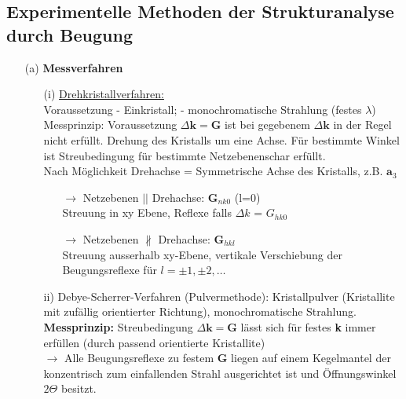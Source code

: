 \subsection{Experimentelle Methoden der Strukturanalyse durch Beugung} \label{kap:4_4}
\begin{itemize}
    \item[(a)] \textbf{Messverfahren}
    \begin{itemize}
        \item[(i)] \underline{Drehkristallverfahren:}\\
        Voraussetzung - Einkristall; - monochromatische Strahlung (festes $\lambda$)\\
        Messprinzip: Voraussetzung $\Delta \textbf{k} = \textbf{G}$ ist bei gegebenem $\Delta \textbf{k}$ in der Regel nicht erfüllt. Drehung des Kristalls um eine Achse. Für bestimmte Winkel ist Streubedingung für bestimmte Netzebenenschar erfüllt.\\
        Nach Möglichkeit Drehachse = Symmetrische Achse des Kristalls, z.B. $\textbf{a}_3$
        \begin{itemize}
            \item[$\rightarrow$] Netzebenen $||$ Drehachse: \textbf{G}$_{nk0}$ (l=0)\\
            Streuung in xy Ebene, Reflexe falls $\Delta k$ = $G_{hk0}$
            \item[$\rightarrow$] Netzebenen $\nparallel$ Drehachse: $\textbf{G}_{hkl}$\\
            Streuung ausserhalb xy-Ebene, vertikale Verschiebung der Beugungsreflexe für $l = \pm 1, \pm 2, \dots$
	   \end{itemize}
	   \item[ii)] Debye-Scherrer-Verfahren (Pulvermethode):
		Kristallpulver (Kristallite mit zufällig orientierter Richtung), monochromatische Strahlung.\\
		\textbf{Messprinzip:}  Streubedingung $\Delta \textbf{k} = \textbf{G}$ lässt sich für festes \textbf{k} immer erfüllen (durch passend orientierte Kristallite)\\
		$\rightarrow$ Alle Beugungsreflexe zu festem \textbf{G} liegen auf einem Kegelmantel der konzentrisch zum einfallenden Strahl ausgerichtet ist und Öffnungswinkel $2\Theta$ besitzt.

\end{itemize}
\end{itemize}
